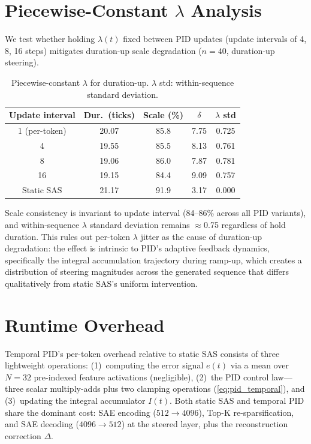 \documentclass{article}
\theoremstyle{plain}
\begin{document}
\section{Piecewise-Constant $\lambda$ Analysis}
\label{app:piecewise}

We test whether holding $\lambda(t)$ fixed between PID updates (update intervals of 4, 8, 16 steps) mitigates duration-up scale degradation ($n{=}40$, duration-up steering).

\begin{table}[h]
  \caption{Piecewise-constant $\lambda$ for duration-up. $\lambda$ std: within-sequence standard deviation.}
  \label{tab:piecewise}
  \begin{center}
  \begin{small}
  \begin{tabular}{ccccc}
    \toprule
    Update interval & Dur.\ (ticks) & Scale (\%) & $\delta$ & $\lambda$ std \\
    \midrule
    1 (per-token) & 20.07 & 85.8 & 7.75 & 0.725 \\
    4 & 19.55 & 85.5 & 8.13 & 0.761 \\
    8 & 19.06 & 86.0 & 7.87 & 0.781 \\
    16 & 19.15 & 84.4 & 9.09 & 0.757 \\
    \midrule
    Static SAS & 21.17 & 91.9 & 3.17 & 0.000 \\
    \bottomrule
  \end{tabular}
  \end{small}
  \end{center}
\end{table}

Scale consistency is invariant to update interval (84--86\% across all PID variants), and within-sequence $\lambda$ standard deviation remains $\approx$0.75 regardless of hold duration. This rules out per-token $\lambda$ jitter as the cause of duration-up degradation: the effect is intrinsic to PID's adaptive feedback dynamics, specifically the integral accumulation trajectory during ramp-up, which creates a distribution of steering magnitudes across the generated sequence that differs qualitatively from static SAS's uniform intervention.

\section{Runtime Overhead}
\label{app:runtime}

Temporal PID's per-token overhead relative to static SAS consists of three lightweight operations: (1)~computing the error signal $e(t)$ via a mean over $N{=}32$ pre-indexed feature activations (negligible), (2)~the PID control law---three scalar multiply-adds plus two clamping operations (\cref{eq:pid_temporal}), and (3)~updating the integral accumulator $I(t)$. Both static SAS and temporal PID share the dominant cost: SAE encoding ($512 {\to} 4096$), Top-K re-sparsification, and SAE decoding ($4096 {\to} 512$) at the steered layer, plus the reconstruction correction $\Delta$.
\end{document}
